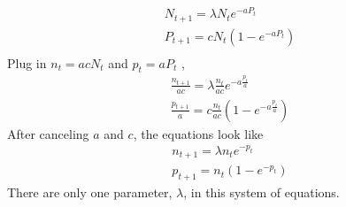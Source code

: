 \begin{homeworkProblem}[7(a)]

\begin{align*}
    N_{t+1} = \lambda N_{t} e^{-aP_t}\\
    P_{t+1} = c N_{t} (1 - e^{-aP_t})\\
\end{align*}
    Plug in $ n_t = acN_t $ and $ p_t = aP_t $ , \\
    \begin{align*}
        \frac{n_{t+1}}{ac} = \lambda \frac{n_t}{ac} e^{-a\frac{p_t}{a}}\\
        \frac{p_{t+1}}{a} = c\frac{n_t}{ac} (1 - e^{-a\frac{p_t}{a}}) 
    \end{align*}
    After canceling $a$ and $c$, the equations look like \begin{align*}
        n_{t+1} = \lambda n_t e^{-p_t} \\
        p_{t+1} = n_t (1 - e^{-p_t})
    \end{align*}
    There are only one parameter, $\lambda$, in this system of equations.
\end{homeworkProblem}
